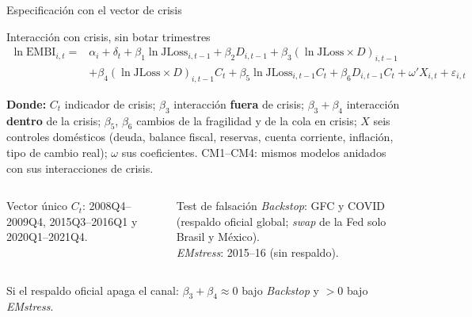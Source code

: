 \documentclass[aspectratio=169]{beamer}
\newcommand{\JLoss}{\mathrm{JLoss}}
\newcommand{\EMBI}{\mathrm{EMBI}}
\begin{document}
\begin{frame}{Especificación con el vector de crisis}
\begin{block}{Interacción con crisis, sin botar trimestres}
\small
\vspace{-6pt}
\[
\begin{aligned}\ln\EMBI_{i,t}={}&\alpha_i+\delta_t+\beta_1\ln\JLoss_{i,t-1}+\beta_2D_{i,t-1}+\beta_3(\ln\JLoss\times D)_{i,t-1}\\&+\beta_4(\ln\JLoss\times D)_{i,t-1}C_t+\beta_5\ln\JLoss_{i,t-1}C_t+\beta_6D_{i,t-1}C_t+\omega'X_{i,t}+\varepsilon_{i,t}\end{aligned}
\]
\vspace{-8pt}
\end{block}
{\scriptsize \textbf{Donde:} $C_t$ indicador de crisis; $\beta_3$ interacción \textbf{fuera} de crisis; $\beta_3+\beta_4$ interacción \textbf{dentro} de la crisis; $\beta_5$, $\beta_6$ cambios de la fragilidad y de la cola en crisis; $X$ seis controles domésticos (deuda, balance fiscal, reservas, cuenta corriente, inflación, tipo de cambio real); $\omega$ sus coeficientes. CM1--CM4: mismos modelos anidados con sus interacciones de crisis.\par}
\vspace{4pt}
\begin{columns}[T]
\begin{block}{Vector único}
\small $C_t$: 2008Q4--2009Q4, 2015Q3--2016Q1 y 2020Q1--2021Q4.
\end{block}
\begin{block}{Test de falsación}
\small \textit{Backstop}: GFC y COVID (respaldo oficial global; \textit{swap} de la Fed solo Brasil y México).\\ \textit{EMstress}: 2015--16 (sin respaldo).
\end{block}
\end{columns}
\vspace{2pt}
\centering\footnotesize Si el respaldo oficial apaga el canal: $\beta_3+\beta_4\approx0$ bajo \textit{Backstop} y $>0$ bajo \textit{EMstress}.
\end{frame}
\end{document}
